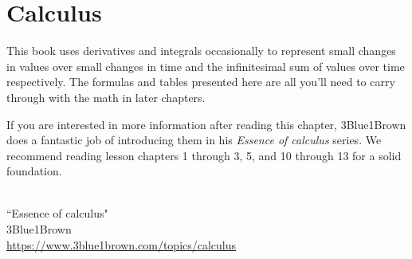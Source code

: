
\chapter{Calculus}

This book uses derivatives and integrals occasionally to represent small changes
in values over small changes in time and the infinitesimal sum of values over
time respectively. The formulas and tables presented here are all you'll need to
carry through with the math in later chapters.

If you are interested in more information after reading this chapter,
3Blue1Brown does a fantastic job of introducing them in his \textit{Essence of
calculus} series. We recommend reading lesson chapters 1 through 3, 5, and 10
through 13 for a solid foundation.
\begin{bookfigure}
   \\
  ``Essence of calculus" \\
  \footnotesize 3Blue1Brown \\
  \url{https://www.3blue1brown.com/topics/calculus}
\end{bookfigure}

\renewcommand*{\chapterpath}{\partpath/calculus}




